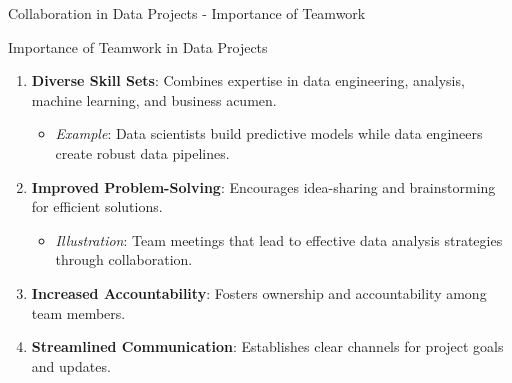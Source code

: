 \documentclass[aspectratio=169]{beamer}
\begin{document}
\begin{frame}[fragile]{Collaboration in Data Projects - Importance of Teamwork}
    \begin{block}{Importance of Teamwork in Data Projects}
        \begin{enumerate}
            \item \textbf{Diverse Skill Sets}: Combines expertise in data engineering, analysis, machine learning, and business acumen.
                \begin{itemize}
                    \item \textit{Example}: Data scientists build predictive models while data engineers create robust data pipelines.
                \end{itemize}
            \item \textbf{Improved Problem-Solving}: Encourages idea-sharing and brainstorming for efficient solutions.
                \begin{itemize}
                    \item \textit{Illustration}: Team meetings that lead to effective data analysis strategies through collaboration.
                \end{itemize}
            \item \textbf{Increased Accountability}: Fosters ownership and accountability among team members.
            \item \textbf{Streamlined Communication}: Establishes clear channels for project goals and updates.
        \end{enumerate}
    \end{block}
\end{frame}
\end{document}

